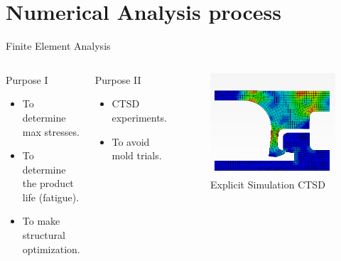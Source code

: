 \documentclass[10pt]{beamer} %
\begin{document}
\section{Numerical Analysis process}
\begin{frame}[fragile]{Finite Element Analysis}
\begin{columns}[T,onlytextwidth]
	\begin{block}{Purpose I}
	\begin{itemize}
		\item {To determine max stresses.}
		\item {To determine the product life (fatigue).}
		\item {To make structural optimization.}
	\end{itemize}
	\end{block}
	\begin{block}{Purpose II}
	\begin{itemize}
		\item {CTSD experiments.}
		\item {To avoid mold trials.}
	\end{itemize}
	\end{block}
	\begin{figure}
	\vspace{1cm}
	\includegraphics[scale=0.25]{CTSDsimulation}
	\caption{Explicit Simulation CTSD}
	\end{figure}
\end{columns}
\end{frame}
\end{document}
